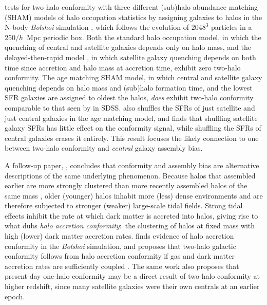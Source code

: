 \citet{Hearin15a} tests for two-halo conformity with three different (sub)halo abundance matching (SHAM) models of halo occupation statistics by assigning galaxies to halos in the N-body \emph{Bolshoi} simulation \citep{Klypin11}, which follows the evolution of $2048^3$ particles in a $250/h$~Mpc periodic box.
Both the standard halo occupation model, in which the quenching of central and satellite galaxies depends only on halo mass, and the delayed-then-rapid model \citep{Wetzel13}, in which satellite galaxy quenching depends on both time since accretion and halo mass at accretion time, exhibit zero two-halo conformity.
The age matching SHAM model, in which central and satellite galaxy quenching depends on halo mass and (sub)halo formation time, and the lowest SFR galaxies are assigned to oldest the halos, \emph{does} exhibit two-halo conformity comparable to that seen by \citet{Kauffmann13} in SDSS.
\citet{Hearin15a} also shuffles the SFRs of just satellite and just central galaxies in the age matching model, and finds that shuffling satellite galaxy SFRs has little effect on the conformity signal, while shuffling the SFRs of central galaxies erases it entirely.
This result focuses the likely connection to one between two-halo conformity and \emph{central} galaxy assembly bias.

A follow-up paper, \citet*{Hearin15b}, concludes that conformity and assembly bias are alternative descriptions of the same underlying phenomenon.
Because halos that assembled earlier are more strongly clustered than more recently assembled halos of the same mass , older (younger) halos inhabit more (less) dense environments and are therefore subjected to stronger (weaker) large-scale tidal fields.
Strong tidal effects inhibit the rate at which dark matter is accreted into halos, giving rise to what \citet{Hearin15b} dubs \emph{halo accretion conformity}:~the clustering of halos at fixed mass with high (lower) dark matter accretion rates.
\citet{Hearin15b} finds evidence of halo accretion conformity in the \emph{Bolshoi} simulation, and proposes that two-halo galactic conformity follows from halo accretion conformity if gas and dark matter accretion rates are sufficiently coupled .
% 
The same work also proposes that present-day one-halo conformity may be a direct result of two-halo conformity at higher redshift, since many satellite galaxies were their own centrals at an earlier epoch.

